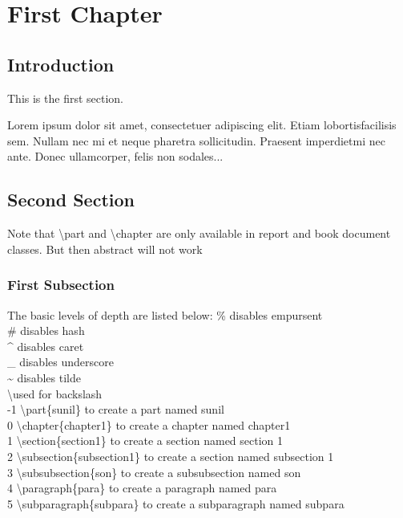 \documentclass[14pt, letterpaper]{book}
\begin{document}


\chapter{First Chapter}
 
\section{Introduction}
 
This is the first section.
 
Lorem  ipsum  dolor  sit  amet,  consectetuer  adipiscing  
elit.   Etiam  lobortisfacilisis sem.  Nullam nec mi et 
neque pharetra sollicitudin.  Praesent imperdietmi nec ante. 
Donec ullamcorper, felis non sodales...
 
\section{Second Section}
Note that \textbackslash part and \textbackslash chapter are only available in report and book document classes.
But then abstract will not work
 
\subsection{First Subsection}
The basic levels of depth are listed below:
\% disables empursent \\
\# disables hash \\
\^{} disables caret \\
\_ disables underscore \\
\~{} disables tilde \\
\textbackslash used for backslash \\
-1 	\textbackslash part\{sunil\} to create a part named sunil  \\
0 	\textbackslash chapter\{chapter1\} to create a chapter named chapter1 \\
1 	\textbackslash section\{section1\} to create a section named section 1 \\
2 	\textbackslash subsection\{subsection1\} to create a section named subsection 1 \\
3 	\textbackslash subsubsection\{son\} to create a subsubsection named son  \\
4 	\textbackslash paragraph\{para\} to create a paragraph named para\\
5 	\textbackslash subparagraph\{subpara\} to create a subparagraph named subpara \\
\end{document}

